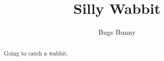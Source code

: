 \documentclass[]{revtex4-1}
\begin{document}
\author{Bugs Bunny}
\title{Silly Wabbit}
%
%
%
%




\begin{abstract}
Going to catch a wabbit.
\end{abstract}
\maketitle

\section{}
\end{document}
